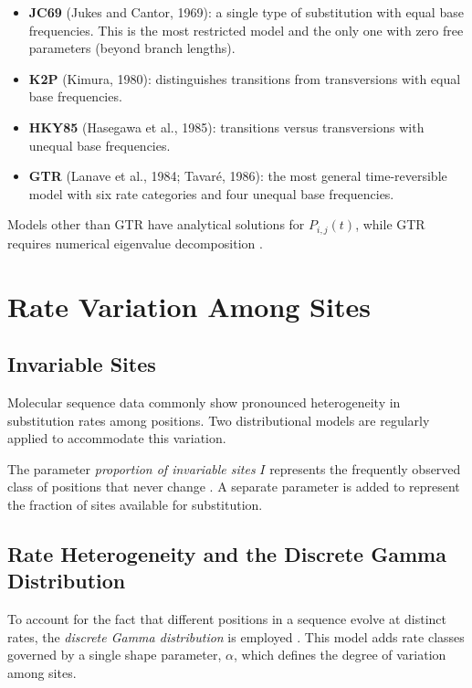 \begin{itemize}
    \item \textbf{JC69} (Jukes and Cantor, 1969): a single type of substitution with equal base frequencies. This is the most restricted model and the only one with zero free parameters (beyond branch lengths).
    \item \textbf{K2P} (Kimura, 1980): distinguishes transitions from transversions with equal base frequencies.
    \item \textbf{HKY85} (Hasegawa et al., 1985): transitions versus transversions with unequal base frequencies.
    \item \textbf{GTR} (Lanave et al., 1984; Tavaré, 1986): the most general time-reversible model with six rate categories and four unequal base frequencies.
\end{itemize}

Models other than GTR have analytical solutions for $P_{i,j}(t)$, while GTR requires numerical eigenvalue decomposition \parencite{wheeler2012}.

\section{Rate Variation Among Sites}

\subsection{Invariable Sites}

Molecular sequence data commonly show pronounced heterogeneity in substitution rates among positions. Two distributional models are regularly applied to accommodate this variation.

The parameter \textit{proportion of invariable sites} $I$ represents the frequently observed class of positions that never change \parencite{hasegawa1985}. A separate parameter is added to represent the fraction of sites available for substitution.

\subsection{Rate Heterogeneity and the Discrete Gamma Distribution}

To account for the fact that different positions in a sequence evolve at distinct rates, the \textit{discrete Gamma distribution} is employed \parencite{yang1994}. This model adds rate classes governed by a single shape parameter, $\alpha$, which defines the degree of variation among sites.


